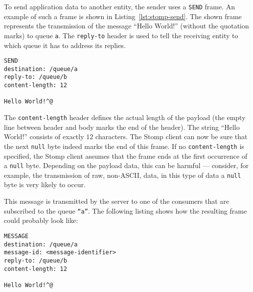 To  send   application  data  to   another  entity,  the  sender   uses  a
\texttt{SEND}  frame.    An  example   of  such  a   frame  is   shown  in
Listing~\ref{lst:stomp-send}. The shown  frame represents the transmission
of the  message ``Hello  World!'' (without the  quotation marks)  to queue
\texttt{a}.  The \texttt{reply-to} header  is used  to tell  the receiving
entity to which queue it has to address its replies.

\medskip
\begin{center}
  \begin{minipage}{.75\textwidth}
    \begin{lstlisting}[captionpos=b,backgroundcolor=\color{listingcolor},frame=lines,numbers=none,stepnumber=5,numberfirstline=false,numberstyle=\tiny,caption={The
        \texttt{SEND} frame is used to send application data.},label={lst:stomp-send}]
SEND
destination: /queue/a
reply-to: /queue/b
content-length: 12

Hello World!^@
    \end{lstlisting}
  \end{minipage}
\end{center}

The  \texttt{content-length}  header  defines  the actual  length  of  the
payload  (the empty  line between  header and  body marks  the end  of the
header).   The   string  ``Hello   World!''   consists  of   exactly  $12$
characters.  The Stomp client can  now be sure that the next \texttt{null}
byte indeed marks the end of this frame.  If no \texttt{content-length} is
specified,  the Stomp  client assumes  that the  frame ends  at  the first
occurrence of a  \texttt{null} byte.  Depending on the  payload data, this
can be  harmful ---  consider, for example,  the transmission of  raw, \ie
non-ASCII, data, in this type of  data a \texttt{null} byte is very likely
to occur.

This message is transmitted by the server to one of the consumers that are
subscribed to  the queue \texttt{``a''}.  The following listing  shows how
the resulting frame could probably look like:

\medskip
\begin{center}
  \begin{minipage}{.75\textwidth}
    \begin{lstlisting}[captionpos=b,backgroundcolor=\color{listingcolor},frame=lines,numbers=none,stepnumber=5,numberfirstline=false,numberstyle=\tiny,caption={The
        \texttt{MESSAGE} frame is used by the server to transmit a message
        to a client.},label={lst:stomp-message}]
MESSAGE
destination: /queue/a
message-id: <message-identifier>
reply-to: /queue/b
content-length: 12

Hello World!^@
    \end{lstlisting}
  \end{minipage}
\end{center}

